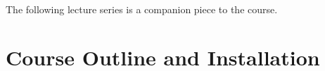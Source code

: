 The following lecture series is a companion piece to the course.

\section{Course Outline and Installation}


